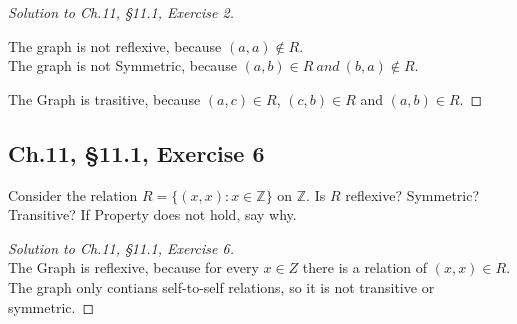 \documentclass[12pt]{amsart}
\numberwithin{equation}{section}
\theoremstyle{definition}
\theoremstyle{remark}
\begin{document}
\begin{proof}[Solution to Ch.11, \S 11.1,  Exercise 2] 

\usetikzlibrary {positioning}
\begin {center}
\end{center}

\begin{enumerate}
The graph is not reflexive, because $ (a, a) \notin R $. \\
The graph is not Symmetric, because $ (a, b) \in R \  and  \  (b, a) \notin R $. \\
\end{enumerate}
The Graph is trasitive, because $ (a, c) \in R $, $ (c, b) \in R $ and $ (a, b) \in R $.

\end{proof}




\subsection*{Ch.11, \S 11.1,  Exercise 6}  Consider the relation $ R = \{(x, x) : x \in \mathbb{Z} \} $ on $ \mathbb{Z} $. Is $ R $ reflexive? Symmetric? Transitive? If Property does not hold, say why.

\begin{proof}[Solution to Ch.11, \S 11.1,  Exercise 6] \ \\
The Graph is reflexive, because for every $ x \in Z $ there is a relation of $ (x, x) \in R $. \\
The graph only contians self-to-self relations, so it is not transitive or symmetric.
\end{proof}
\end{document}
